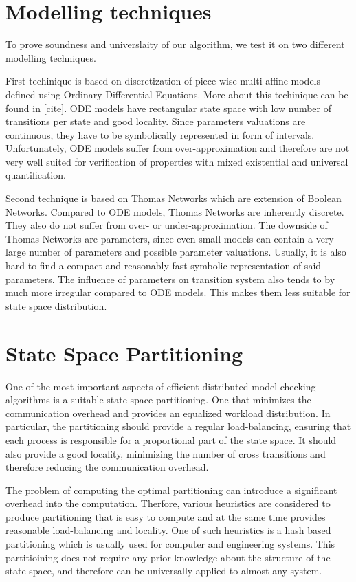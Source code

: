 \documentclass[12pt,oneside,draft]{fithesis2}
\begin{document}
		\section{Modelling techniques}
	
			To prove soundness and universlaity of our algorithm, we test it on two different modelling techniques. 
			
			First techinique is based on discretization of piece-wise multi-affine models defined using Ordinary Differential Equations. More about this techinique can be found in [cite]. ODE models have rectangular state space with low number of transitions per state and good locality. Since parameters valuations are continuous, they have to be symbolically represented in form of intervals. Unfortunately, ODE models suffer from over-approximation and therefore are not very well suited for verification of properties with mixed existential and universal quantification.
	
			Second technique is based on Thomas Networks which are extension of Boolean Networks. Compared to ODE models, Thomas Networks are inherently discrete. They also do not suffer from over- or under-approximation. The downside of Thomas Networks are parameters, since even small models can contain a very large number of parameters and possible parameter valuations. Usually, it is also hard to find a compact and reasonably fast symbolic representation of said parameters. The influence of parameters on transition system also tends to by much more irregular compared to ODE models. This makes them less suitable for state space distribution.
			
		\section{State Space Partitioning}
			
			One of the most important aspects of efficient distributed model checking algorithms is a suitable state space partitioning. One that minimizes the communication overhead and provides an equalized workload distribution. In particular, the partitioning should provide a regular load-balancing, ensuring that each process is responsible for a proportional part of the state space. It should also provide a good locality, minimizing the number of cross transitions and therefore reducing the communication overhead.
			
			The problem of computing the optimal partitioning can introduce a significant overhead into the computation. Therfore, various heuristics are considered to produce partitioning that is easy to compute and at the same time provides reasonable load-balancing and locality. One of such heuristics is a hash based partitioning which is usually used for computer and engineering systems. This partitioining does not require any prior knowledge about the structure of the state space, and therefore can be universally applied to almost any system.
			
\end{document}
